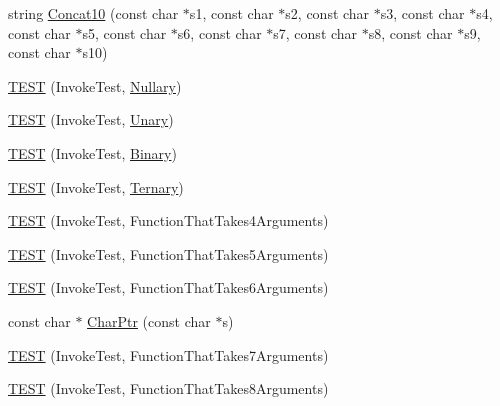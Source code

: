 \begin{DoxyCompactItemize}
\item 
string \hyperlink{namespacetesting_1_1gmock__more__actions__test_aba6aadf0de090a08bf9e467cdc09ffd8}{Concat10} (const char $\ast$s1, const char $\ast$s2, const char $\ast$s3, const char $\ast$s4, const char $\ast$s5, const char $\ast$s6, const char $\ast$s7, const char $\ast$s8, const char $\ast$s9, const char $\ast$s10)
\item 
\hyperlink{namespacetesting_1_1gmock__more__actions__test_a9c5fbd26c6cc6ed31aed5bafb2fa8e5c}{T\+E\+ST} (Invoke\+Test, \hyperlink{namespacetesting_1_1gmock__more__actions__test_acdd2dd80f777fdb770b513b63064ac19}{Nullary})
\item 
\hyperlink{namespacetesting_1_1gmock__more__actions__test_a28b57a9f9d38574b7c033988ad528ddd}{T\+E\+ST} (Invoke\+Test, \hyperlink{namespacetesting_1_1gmock__more__actions__test_aad456ea2ee1b0cb2741b676a34f540a3}{Unary})
\item 
\hyperlink{namespacetesting_1_1gmock__more__actions__test_a906bd5cc7aa38e2cc861a9732481fce7}{T\+E\+ST} (Invoke\+Test, \hyperlink{namespacetesting_1_1gmock__more__actions__test_a853c9f048674a60798b930750b74a1df}{Binary})
\item 
\hyperlink{namespacetesting_1_1gmock__more__actions__test_a424fb6113c6c1ab2157edf854a4ae9fe}{T\+E\+ST} (Invoke\+Test, \hyperlink{namespacetesting_1_1gmock__more__actions__test_ab98b352528a0b72625b4710a6fc648a1}{Ternary})
\item 
\hyperlink{namespacetesting_1_1gmock__more__actions__test_a17f41c1f7f180371d4d240089cdff0dd}{T\+E\+ST} (Invoke\+Test, Function\+That\+Takes4\+Arguments)
\item 
\hyperlink{namespacetesting_1_1gmock__more__actions__test_a3b6b1b682295a1d04d57374445359e94}{T\+E\+ST} (Invoke\+Test, Function\+That\+Takes5\+Arguments)
\item 
\hyperlink{namespacetesting_1_1gmock__more__actions__test_a9a6c89b83ba253838d05d7ee5da7d954}{T\+E\+ST} (Invoke\+Test, Function\+That\+Takes6\+Arguments)
\item 
const char $\ast$ \hyperlink{namespacetesting_1_1gmock__more__actions__test_aa19ac39aaa785adeb8d7837d58b824f3}{Char\+Ptr} (const char $\ast$s)
\item 
\hyperlink{namespacetesting_1_1gmock__more__actions__test_af4756ff87444dc6deb438a350ab5527f}{T\+E\+ST} (Invoke\+Test, Function\+That\+Takes7\+Arguments)
\item 
\hyperlink{namespacetesting_1_1gmock__more__actions__test_a48d99224a323afa3c9772a868dd60214}{T\+E\+ST} (Invoke\+Test, Function\+That\+Takes8\+Arguments)

\end{DoxyCompactItemize}
